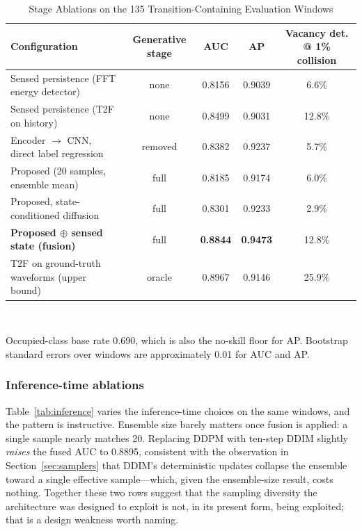 \documentclass[lettersize,journal]{IEEEtran}
\begin{document}
\begin{table}[t]
\centering
\caption{Stage Ablations on the 135 Transition-Containing Evaluation Windows}
\label{tab:ablation}
\renewcommand{\arraystretch}{1.2}
\begin{tabular}{@{}lcccc@{}}
\toprule
\textbf{Configuration} & \textbf{Generative stage} & \textbf{AUC} &
\textbf{AP} & \textbf{Vacancy det. @ 1\% collision} \\
\midrule
Sensed persistence (FFT energy detector)      & none    & 0.8156 & 0.9039 & 6.6\% \\
Sensed persistence (T2F on history)           & none    & 0.8499 & 0.9031 & 12.8\% \\
Encoder $\rightarrow$ CNN, direct label regression & removed & 0.8382 & 0.9237 & 5.7\% \\
Proposed (20 samples, ensemble mean)          & full    & 0.8185 & 0.9174 & 6.0\% \\
Proposed, state-conditioned diffusion         & full    & 0.8301 & 0.9233 & 2.9\% \\
\textbf{Proposed $\oplus$ sensed state (fusion)} & full & \textbf{0.8844} & \textbf{0.9473} & 12.8\% \\
T2F on ground-truth waveforms (upper bound)   & oracle  & 0.8967 & 0.9146 & 25.9\% \\
\bottomrule
\end{tabular}
\\[2pt]
\parbox{0.95\textwidth}{\footnotesize Occupied-class base rate 0.690,
which is also the no-skill floor for AP. Bootstrap standard errors over
windows are approximately 0.01 for AUC and AP.}
\end{table}

\subsubsection{Inference-time ablations}
Table~\ref{tab:inference} varies the inference-time choices on the same
windows, and the pattern is instructive. Ensemble size barely matters
once fusion is applied: a single sample nearly matches 20. Replacing
DDPM with ten-step DDIM slightly \emph{raises} the fused AUC to 0.8895,
consistent with the observation in Section~\ref{sec:samplers} that DDIM's
deterministic updates collapse the ensemble toward a single effective
sample---which, given the ensemble-size result, costs nothing. Together
these two rows suggest that the sampling diversity the architecture was
designed to exploit is not, in its present form, being exploited; that
is a design weakness worth naming.
\end{document}
